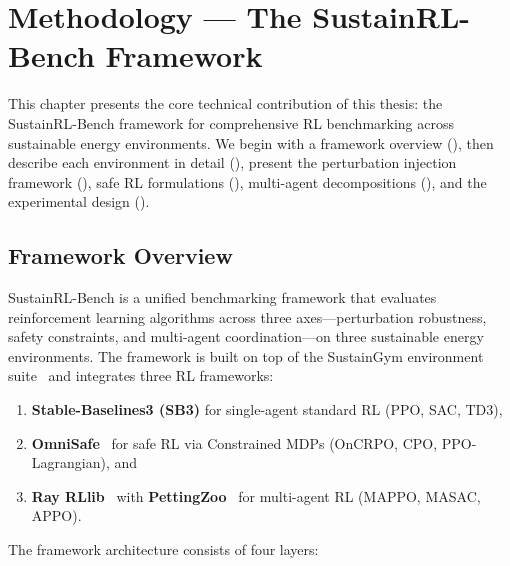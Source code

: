 \chapter{Methodology --- The SustainRL-Bench Framework}
\label{ch:methodology}

This chapter presents the core technical contribution of this thesis: the SustainRL-Bench framework for comprehensive RL benchmarking across sustainable energy environments. We begin with a framework overview (), then describe each environment in detail (), present the perturbation injection framework (), safe RL formulations (), multi-agent decompositions (), and the experimental design ().

\section{Framework Overview}
\label{sec:framework}

SustainRL-Bench is a unified benchmarking framework that evaluates reinforcement learning algorithms across three axes---perturbation robustness, safety constraints, and multi-agent coordination---on three sustainable energy environments. The framework is built on top of the SustainGym environment suite~\citep{yeh2023sustaingym} and integrates three RL frameworks:

\begin{enumerate}
    \item \textbf{Stable-Baselines3 (SB3)} for single-agent standard RL (PPO, SAC, TD3),
    \item \textbf{OmniSafe}~\citep{ji2023omnisafe} for safe RL via Constrained MDPs (OnCRPO, CPO, PPO-Lagrangian), and
    \item \textbf{Ray RLlib}~\citep{liang2018rllib} with \textbf{PettingZoo}~\citep{terry2021pettingzoo} for multi-agent RL (MAPPO, MASAC, APPO).
\end{enumerate}

The framework architecture consists of four layers:


